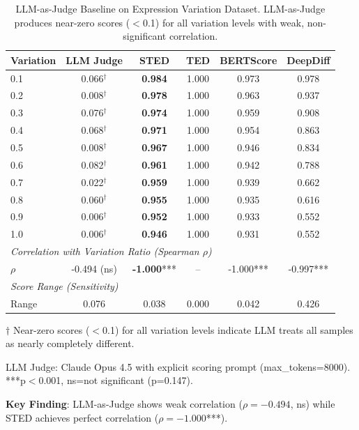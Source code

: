 \begin{table}[h]
\centering
\caption{LLM-as-Judge Baseline on Expression Variation Dataset. LLM-as-Judge produces near-zero scores ($<$0.1) for all variation levels with weak, non-significant correlation.}
\label{tab:llm_judge_expression}
\begin{tabular}{lccccc}
\toprule
Variation & LLM Judge & STED & TED & BERTScore & DeepDiff \\
\midrule
0.1 & 0.066$^\dagger$ & \textbf{0.984} & 1.000 & 0.973 & 0.978 \\
0.2 & 0.008$^\dagger$ & \textbf{0.978} & 1.000 & 0.963 & 0.937 \\
0.3 & 0.076$^\dagger$ & \textbf{0.974} & 1.000 & 0.959 & 0.908 \\
0.4 & 0.068$^\dagger$ & \textbf{0.971} & 1.000 & 0.954 & 0.863 \\
0.5 & 0.008$^\dagger$ & \textbf{0.967} & 1.000 & 0.946 & 0.834 \\
0.6 & 0.082$^\dagger$ & \textbf{0.961} & 1.000 & 0.942 & 0.788 \\
0.7 & 0.022$^\dagger$ & \textbf{0.959} & 1.000 & 0.939 & 0.662 \\
0.8 & 0.060$^\dagger$ & \textbf{0.955} & 1.000 & 0.935 & 0.616 \\
0.9 & 0.006$^\dagger$ & \textbf{0.952} & 1.000 & 0.933 & 0.552 \\
1.0 & 0.006$^\dagger$ & \textbf{0.946} & 1.000 & 0.931 & 0.552 \\
\midrule
\multicolumn{6}{l}{\textit{Correlation with Variation Ratio (Spearman $\rho$)}} \\
$\rho$ & -0.494 (ns) & \textbf{-1.000}*** & -- & -1.000*** & -0.997*** \\
\midrule
\multicolumn{6}{l}{\textit{Score Range (Sensitivity)}} \\
Range & 0.076 & 0.038 & 0.000 & 0.042 & 0.426 \\
\bottomrule
\end{tabular}
\begin{tablenotes}
\small
\item $\dagger$ Near-zero scores ($<$0.1) for all variation levels indicate LLM treats all samples as nearly completely different.
\item LLM Judge: Claude Opus 4.5 with explicit scoring prompt (max\_tokens=8000). ***p$<$0.001, ns=not significant (p=0.147).
\item \textbf{Key Finding}: LLM-as-Judge shows weak correlation ($\rho=-0.494$, ns) while STED achieves perfect correlation ($\rho=-1.000$***).
\end{tablenotes}
\end{table}
